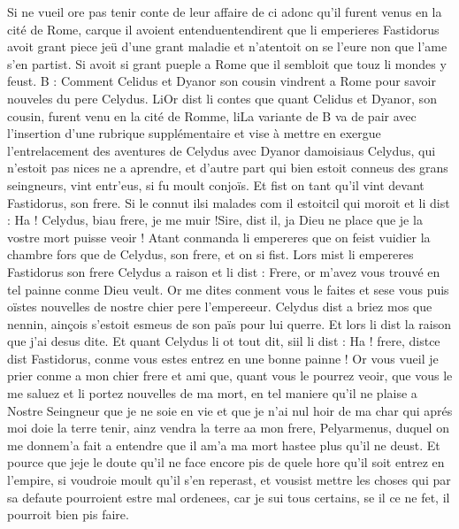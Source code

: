 \documentclass{article}
\begin{document}
\begin{pages}
   Si ne vueil ore pas tenir conte de leur affaire de ci adonc qu’il 
      furent venus en la cité de Rome, 
   carque il 
   avoient entenduentendirent que li emperieres 
   Fastidorus avoit grant piece jeü d’une grant maladie et n’atentoit on se l’eure non que 
   l’ame s’en partist. Si avoit si grant pueple a Rome que il sembloit que touz li mondes y feust.
    \pendRubrique B : Comment Celidus et Dyanor son cousin vindrent a Rome pour savoir nouveles du pere Celydus.
\pstart LiOr dist li contes que quant Celidus et Dyanor, 
   son cousin, furent venu en la cité de Romme, liLa variante de B va de pair avec l'insertion
   d'une rubrique supplémentaire et vise à mettre en exergue l'entrelacement des aventures de Celydus avec Dyanor 
   damoisiaus Celydus, 
   qui n’estoit pas nices ne a aprendre, et d’autre part qui bien estoit conneus des grans seingneurs, vint entr’eus, 
   si fu moult conjoïs. Et fist on tant qu’il vint devant 
   Fastidorus, son frere. 
   Si le connut ilsi malades com 
   il estoitcil qui moroit et li dist :
   Ha ! Celydus, biau frere, je me muir !Sire, dist il, ja Dieu ne place que je la vostre mort puisse veoir !
   Atant conmanda li empereres que on feist vuidier la chambre fors 
   que de Celydus, 
   son frere, et on si fist. 
   Lors mist li empereres Fastidorus 
   son frere Celydus a raison et 
   li dist :
   Frere, or m’avez vous trouvé en tel painne conme Dieu veult. 
      Or me dites conment vous le faites et sese vous puis oïstes 
      nouvelles de nostre chier pere l’empereeur.
   Celydus dist a briez mos que 
   nennin, ainçois s’estoit esmeus de son païs pour lui querre. 
   Et lors li dist la raison que j’ai desus dite. 
   Et quant Celydus li ot tout dit, 
   siil li dist :
   Ha ! frere, distce dist 
      Fastidorus, conme vous estes entrez en une bonne painne ! 
      Or vous vueil je prier conme a mon chier frere et ami que, quant vous le 
      pourrez veoir, que vous le me saluez et li portez nouvelles de ma mort, en tel maniere qu’il ne plaise a Nostre Seingneur 
   que je ne soie en vie et que je n’ai nul hoir de ma char qui aprés moi doie la terre tenir, 
      ainz vendra la terre aa mon frere, Pelyarmenus, 
      duquel on me donnem'a fait a entendre que 
      il am'a ma mort hastee plus qu’il ne 
         deust. Et pource que jeje le doute qu’il ne face encore pis 
      de quele hore qu’il soit entrez en l’empire, si voudroie moult qu’il s’en reperast, et vousist mettre les choses qui par sa 
      defaute pourroient estre mal ordenees, car je sui tous certains, se il ce ne fet, il pourroit bien pis faire. \pend

\end{pages}
\end{document}
